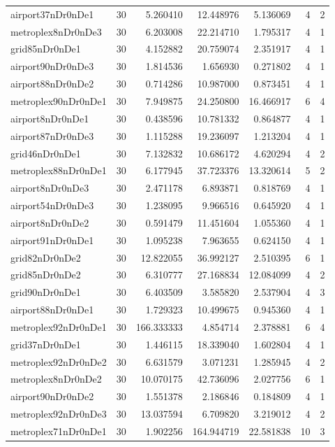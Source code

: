 \documentclass[../../../thesis.tex]{subfiles}
\begin{document}
\begin{longtable}{|l|r|r|r|r|r|r|}
airport37nDr0nDe1 & 30 & 5.260410 & 12.448976 & 5.136069 & 4 & 2 \\
metroplex8nDr0nDe3 & 30 & 6.203008 & 22.214710 & 1.795317 & 4 & 1 \\
grid85nDr0nDe1 & 30 & 4.152882 & 20.759074 & 2.351917 & 4 & 1 \\
airport90nDr0nDe3 & 30 & 1.814536 & 1.656930 & 0.271802 & 4 & 1 \\
airport88nDr0nDe2 & 30 & 0.714286 & 10.987000 & 0.873451 & 4 & 1 \\
metroplex90nDr0nDe1 & 30 & 7.949875 & 24.250800 & 16.466917 & 6 & 4 \\
airport8nDr0nDe1 & 30 & 0.438596 & 10.781332 & 0.864877 & 4 & 1 \\
airport87nDr0nDe3 & 30 & 1.115288 & 19.236097 & 1.213204 & 4 & 1 \\
grid46nDr0nDe1 & 30 & 7.132832 & 10.686172 & 4.620294 & 4 & 2 \\
metroplex88nDr0nDe1 & 30 & 6.177945 & 37.723376 & 13.320614 & 5 & 2 \\
airport8nDr0nDe3 & 30 & 2.471178 & 6.893871 & 0.818769 & 4 & 1 \\
airport54nDr0nDe3 & 30 & 1.238095 & 9.966516 & 0.645920 & 4 & 1 \\
airport8nDr0nDe2 & 30 & 0.591479 & 11.451604 & 1.055360 & 4 & 1 \\
airport91nDr0nDe1 & 30 & 1.095238 & 7.963655 & 0.624150 & 4 & 1 \\
grid82nDr0nDe2 & 30 & 12.822055 & 36.992127 & 2.510395 & 6 & 1 \\
grid85nDr0nDe2 & 30 & 6.310777 & 27.168834 & 12.084099 & 4 & 2 \\
grid90nDr0nDe1 & 30 & 6.403509 & 3.585820 & 2.537904 & 4 & 3 \\
airport88nDr0nDe1 & 30 & 1.729323 & 10.499675 & 0.945360 & 4 & 1 \\
metroplex92nDr0nDe1 & 30 & 166.333333 & 4.854714 & 2.378881 & 6 & 4 \\
grid37nDr0nDe1 & 30 & 1.446115 & 18.339040 & 1.602804 & 4 & 1 \\
metroplex92nDr0nDe2 & 30 & 6.631579 & 3.071231 & 1.285945 & 4 & 2 \\
metroplex8nDr0nDe2 & 30 & 10.070175 & 42.736096 & 2.027756 & 6 & 1 \\
airport90nDr0nDe2 & 30 & 1.551378 & 2.186846 & 0.184809 & 4 & 1 \\
metroplex92nDr0nDe3 & 30 & 13.037594 & 6.709820 & 3.219012 & 4 & 2 \\
metroplex71nDr0nDe1 & 30 & 1.902256 & 164.944719 & 22.581838 & 10 & 3 \\

\end{longtable}
\end{document}

